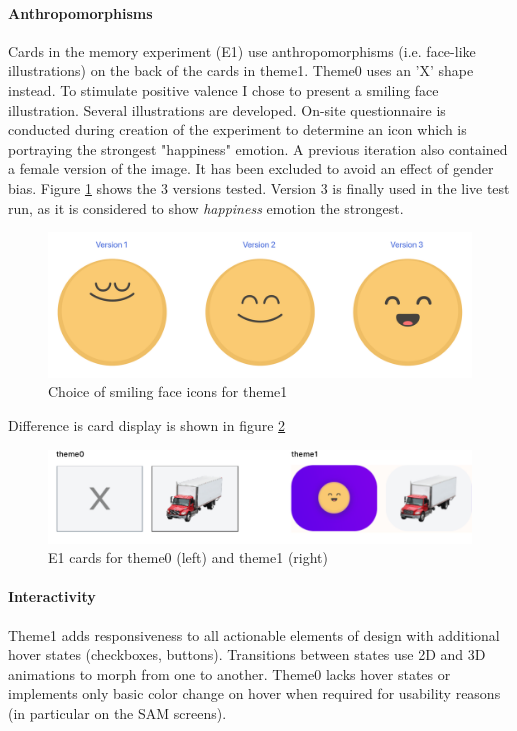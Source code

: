 	\paragraph{Anthropomorphisms}
	
	Cards in the memory experiment (E1) use anthropomorphisms (i.e. face-like illustrations) on the back of the cards in theme1. Theme0 uses an 'X' shape instead. To stimulate positive valence I chose to present a smiling face illustration. Several illustrations are developed. On-site questionnaire is conducted during creation of the experiment to determine an icon which is portraying the strongest "happiness" emotion. A previous iteration also contained a female version of the image. It has been excluded to avoid an effect of gender bias. Figure \ref{fig:smiling-icons} shows the 3 versions tested. Version 3 is finally used in the live test run, as it is considered to show \textit{happiness} emotion the strongest.
	
	\begin{figure}[h]
		\centering
		\includegraphics[width=0.7\linewidth]{graphics/smiling-icons}
		\caption{Choice of smiling face icons for theme1}
		\label{fig:smiling-icons}
	\end{figure}

	Difference is card display is shown in figure \ref{fig:cards}
	
	
\begin{figure}[h!]
	\centering
	\includegraphics[width=.8\linewidth]{graphics/designfeatures/cards}
	\caption{E1 cards for theme0 (left) and theme1 (right)}
	\label{fig:cards}
\end{figure}

	\paragraph{Interactivity}
	
	Theme1 adds responsiveness to all actionable elements of design with additional hover states (checkboxes, buttons). Transitions between states use 2D and 3D animations to morph from one to another. Theme0 lacks hover states or implements only basic color change on hover when required for usability reasons (in particular on the SAM screens).
	
